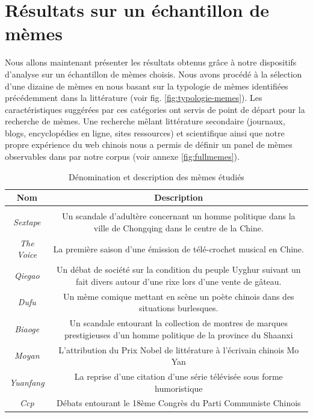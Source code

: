 \section{Résultats sur un échantillon de mèmes}
\label{sec:results-memes}

Nous allons maintenant présenter les résultats obtenus grâce à notre dispositifs d'analyse sur un échantillon de mèmes choisis. Nous avons procédé à la sélection d'une dizaine de mèmes en  nous basant sur la typologie de mèmes identifiées précédemment dans la littérature (voir fig. \ref{fig:typologie-memes}). Les caractéristiques suggérées par ces catégories ont servis de point de départ pour la recherche de mèmes. Une recherche mêlant littérature secondaire (journaux, blogs, encyclopédies en ligne, sites ressources) et scientifique ainsi que notre propre expérience du web chinois nous a permis de définir un panel de mèmes observables dans par notre corpus (voir annexe \ref{fig:fullmemes}). 

\begin{table}[h!]
  \begin{tabulary}{\textwidth}{c|C}

    \textbf{Nom} &
    \textbf{Description}\\
    \hline \\[-1.5ex]
    \textit{Sextape} &
    Un scandale d{\textquoteright}adultère concernant un homme politique
    dans la ville de Chongqing dans le centre de la Chine.\\[2ex]

    \textit{The Voice} &
    La première saison d{\textquoteright}une émission de
    télé-crochet musical en Chine.\\[2ex]

    \textit{Qiegao} &
    Un débat de société sur la condition du peuple Uyghur suivant un
    fait divers autour d{\textquoteright}une rixe lors
    d{\textquoteright}une vente de gâteau.\\[2ex]

    \textit{Dufu} &
    Un mème comique mettant en scène un poète chinois dans des
    situations burlesques.\\[2ex]

    \textit{Biaoge} &
    Un scandale entourant la collection de montres de marques prestigieuses
    d{\textquoteright}un homme politique de la province du Shaanxi \\[2ex]

    \textit{Moyan} &
    L{\textquoteright}attribution du Prix Nobel de littérature \`a
    l{\textquoteright}écrivain chinois Mo Yan\\[2ex]

    \textit{Yuanfang} &
    La reprise d{\textquoteright}une citation d{\textquoteright}une série
    télévisée sous forme humoristique\\[2ex]

    \textit{Ccp} &
    Débats entourant le 18ème Congrès du Parti Communiste Chinois\\[2ex]

  \end{tabulary}
  \caption{Dénomination et description des mèmes étudiés}
  \label{fig:meme-sample}
\end{table}

